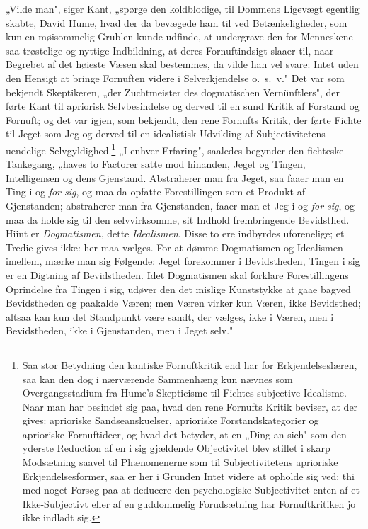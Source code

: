 \documentclass[12pt]{book}
\newcommand{\opage}[1]{\marginnote{\footnotesize\textit{[#1]}}}
\begin{document}
„Vilde man", siger Kant, „spørge den koldblodige, til Dommens Ligevægt egentlig
skabte, David Hume, hvad der da bevægede ham til ved Betænkeligheder, som kun en
møisommelig Grublen kunde udfinde, at undergrave den for Menneskene saa trøstelige og
nyttige Indbildning, at deres Fornuftindsigt slaaer til, naar Begrebet af det høieste
Væsen skal bestemmes, da vilde han vel svare: Intet uden den Hensigt at bringe
Fornuften videre i Selverkjendelse o.\ s.\ v." Det var som bekjendt Skeptikeren, „der
Zuchtmeister des dogmatischen Vernünftlers", der førte Kant til apriorisk
Selvbesindelse og derved til en sund Kritik af Forstand og Fornuft; og det var igjen,
som bekjendt, den rene Fornufts Kritik, der førte Fichte til Jeget som Jeg og derved
til en idealistisk Udvikling af Subjectivitetens uendelige
Selvgyldighed.\footnote{Saa stor Betydning den kantiske Fornuftkritik end har for
Erkjendelseslæren, saa kan den dog i nærværende Sammenhæng kun nævnes som
Overgangsstadium fra Hume's Skepticisme til Fichtes subjective Idealisme. Naar man
har besindet sig paa, hvad den rene Fornufts Kritik beviser, at der gives: aprioriske
Sandseanskuelser, aprioriske Forstandskategorier og aprioriske Fornuftideer, og hvad
det betyder, at en „Ding an sich" som den yderste Reduction af en i sig gjældende
Objectivitet blev stillet i skarp Modsætning saavel til Phænomenerne som til
Subjectivitetens aprioriske Erkjendelsesformer, saa er her i Grunden Intet videre at
opholde sig ved; thi med noget Forsøg paa at deducere den psychologiske Subjectivitet
enten af et Ikke-Subjectivt eller af en guddommelig Forudsætning har Fornuftkritiken
jo ikke indladt sig.}
\opage{31} „I enhver Erfaring", saaledes begynder den fichteske Tankegang, „haves to Factorer
satte mod hinanden, Jeget og Tingen, Intelligensen og dens Gjenstand. Abstraherer
man fra Jeget, saa faaer man en Ting i og \emph{for sig}, og maa da opfatte
Forestillingen som et Produkt af Gjenstanden; abstraherer man fra Gjenstanden, faaer
man et Jeg i og \emph{for sig}, og maa da holde sig til den selvvirksomme, sit
Indhold frembringende Bevidsthed. Hiint er \emph{Dogmatismen}, dette
\emph{Idealismen}. Disse to ere indbyrdes uforenelige; et Tredie gives ikke: her maa
vælges. For at dømme Dogmatismen og Idealismen imellem, mærke man sig Følgende: Jeget
forekommer i Bevidstheden, Tingen i sig er en Digtning af Bevidstheden. Idet
Dogmatismen skal forklare Forestillingens Oprindelse fra Tingen i sig, udøver den det
mislige Kunststykke at gaae bagved Bevidstheden og paakalde Væren; men Væren virker
kun Væren, ikke Bevidsthed; altsaa kan kun det Standpunkt være sandt, der vælges,
ikke i Væren, men i Bevidstheden, ikke i Gjenstanden, men i Jeget selv."
\end{document}
